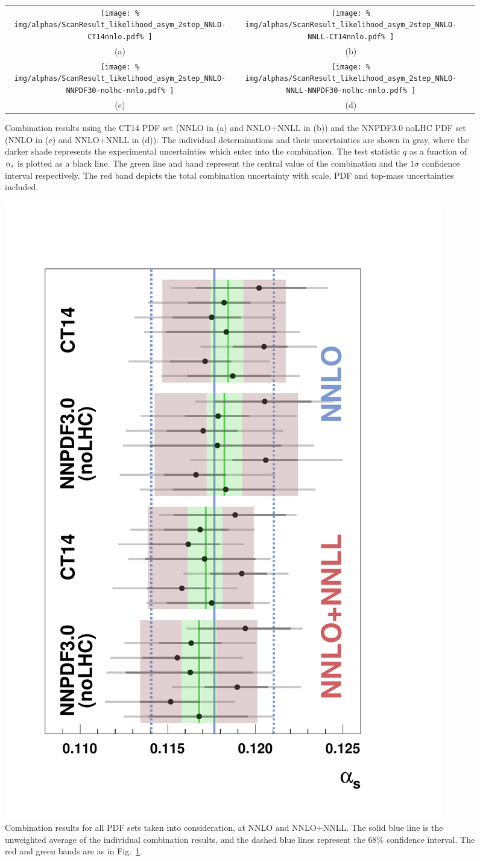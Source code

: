 \newcommand{\ScanFigureWidth}{0.47}  
\begin{figure}[htb]
\centering
\begin{tabular}{ccc}
\texttt{[image: \%
    img/alphas/ScanResult\_likelihood\_asym\_2step\_NNLO-CT14nnlo.pdf\%
    ]}
&
\texttt{[image: \%
    img/alphas/ScanResult\_likelihood\_asym\_2step\_NNLO-NNLL-CT14nnlo.pdf\%
    ]}
\\[-6pt]
(a) & (b) \\[8pt]
%
\texttt{[image: \%
    img/alphas/ScanResult\_likelihood\_asym\_2step\_NNLO-NNPDF30-nolhc-nnlo.pdf\%
    ]}
&
\texttt{[image: \%
    img/alphas/ScanResult\_likelihood\_asym\_2step\_NNLO-NNLL-NNPDF30-nolhc-nnlo.pdf\%
    ]}
\\[-6pt]
(c) & (d) \\[6pt]
\end{tabular}
\vspace{-0.3cm}
\caption{
Combination results using the CT14 PDF set (NNLO in (a) and NNLO+NNLL in (b)) and the NNPDF3.0 noLHC PDF set (NNLO in (c) and NNLO+NNLL in (d)).
%
The individual determinations and their uncertainties are shown in gray, where the darker shade represents the experimental uncertainties which enter into the combination.
The test statistic $q$ as a function of $\alpha_s$ is plotted as a black line.
The green line and band represent the central value of the combination and the $1\sigma$ confidence interval respectively. 
The red band depicts the total combination uncertainty with scale, PDF
and top-mass uncertainties included.
}
\label{fig:ScanResults}
\end{figure}
% 
%
\begin{figure}[htb]
\centering
\includegraphics[width=0.6\linewidth]{img/alphas/summaryPlot_Collection_bfins_Jul05.pdf}
\vspace{-0.3cm}
\caption{
Combination results for all PDF sets taken into consideration, at NNLO
and NNLO+NNLL. The solid blue line is the unweighted average of the
individual combination results, and the dashed blue lines represent
the 68\% confidence interval.
%
The red and green bands are as in Fig.~\ref{fig:ScanResults}.
%
}
\label{fig:unweightedaverage}
\end{figure}

